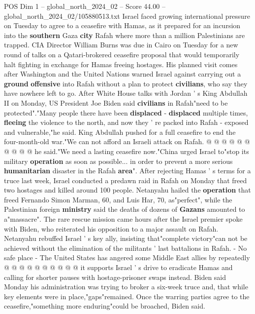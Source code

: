 \begin{textsample}{POS Dim 1 – global\_north\_2024\_02 – Score 44.00 – global\_north\_2024\_02/105880513.txt}  \label{ex:f1_pos_094}
Israel faced growing international pressure on Tuesday to agree to a ceasefire with Hamas, as it prepared for an incursion into the \textbf{southern} Gaza \textbf{city} Rafah where more than a million Palestinians are trapped.
CIA Director William Burns was due in Cairo on Tuesday for a new round of talks on a Qatari-brokered ceasefire proposal that would temporarily halt fighting in exchange for Hamas freeing hostages.
His planned visit comes after Washington and the United Nations warned Israel against carrying out a \textbf{ground} \textbf{offensive} into Rafah without a plan to protect \textbf{civilians}, who say they have nowhere left to go.
After White House talks with Jordan ' s King Abdullah II on Monday, US President Joe Biden said \textbf{civilians} in Rafah"need to be protected"."Many people there have been \textbf{displaced} - \textbf{displaced} multiple times, \textbf{fleeing} the violence to the north, and now they ' re packed into Rafah - exposed and vulnerable,"he said.
King Abdullah pushed for a full ceasefire to end the four-month-old war."We can not afford an Israeli attack on Rafah. @ @ @ @ @ @ @ @ @ @ he said."We need a lasting ceasefire now."China urged Israel to"stop its military \textbf{operation} as soon as possible... in order to prevent a more serious \textbf{humanitarian} disaster in the Rafah \textbf{area}".
After rejecting Hamas ' s terms for a truce last week, Israel conducted a predawn raid in Rafah on Monday that freed two hostages and killed around 100 people.
Netanyahu hailed the \textbf{operation} that freed Fernando Simon Marman, 60, and Luis Har, 70, as"perfect", while the Palestinian foreign \textbf{ministry} said the deaths of dozens of \textbf{Gazans} amounted to a"massacre".
The rare rescue mission came hours after the Israel premier spoke with Biden, who reiterated his opposition to a major assault on Rafah.
Netanyahu rebuffed Israel ' s key ally, insisting that"complete victory"can not be achieved without the elimination of the militants ' last battalions in Rafah. - No safe place - The United States has angered some Middle East allies by repeatedly @ @ @ @ @ @ @ @ @ @ it supports Israel ' s drive to eradicate Hamas and calling for shorter pauses with hostage-prisoner swaps instead.
Biden said Monday his administration was trying to broker a six-week truce and, that while key elements were in place,"gaps"remained.
Once the warring parties agree to the ceasefire,"something more enduring"could be broached, Biden said.

\end{textsample}
